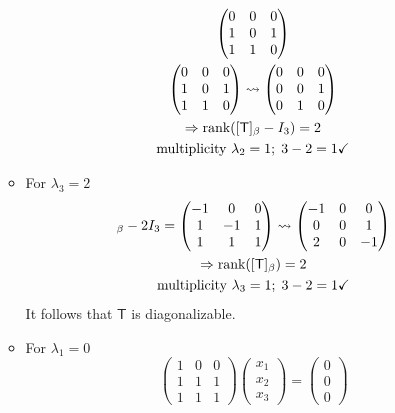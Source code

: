 \begin{enumerate}
\begin{itemize}
\begin{gather}
\begin{pmatrix}
0 & 0 & 0\\
1 & 0 & 1\\
1 & 1 & 0
\end{pmatrix}\\
\begin{pmatrix}
0 & 0 & 0\\
1 & 0 & 1\\
1 & 1 & 0
\end{pmatrix}\leadsto
\begin{pmatrix}
0 & 0 & 0\\
0 & 0 & 1\\
0 & 1 & 0
\end{pmatrix}\\
\Rightarrow \text{rank}({[\mathsf{T}]_\beta -I_3}) = 2 \\
\text{multiplicity } \lambda_2 =1; \; 3-2 =1 \checkmark
\end{gather}
\item For $\lambda_3 = 2$
\begin{gather}
[\mathsf{T}]_\beta - 2 I_3 = \begin{pmatrix}
-1 & 0 & 0\\
1 & -1 & 1\\
1 & 1 & 1
\end{pmatrix}\leadsto
\begin{pmatrix}
-1 & 0 & 0\\
0  & 0 & 1\\
2 & 0 & -1
\end{pmatrix}\\
\implies \rank{[\mathsf{T}]_\beta} =2\\
\text{multiplicity } \lambda_3 =1; \; 3-2 =1 \checkmark
\end{gather}
It follows that $\mathsf{T}$ is diagonalizable.
\end{itemize}
\begin{itemize}
\item For $\lambda_1 = 0$
\begin{equation}
\begin{pmatrix}
1 & 0 & 0\\
1 & 1 & 1 \\
1 & 1 & 1
\end{pmatrix}
\begin{pmatrix}
x_1\\x_2\\x_3
\end{pmatrix}
=
\begin{pmatrix}
0\\0\\0

\end{pmatrix}
\end{equation}
\end{itemize}
\end{enumerate}
